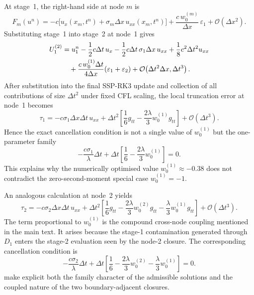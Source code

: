 \documentclass[review,hidelinks,onefignum,onetabnum]{siamart251216}
\newcommand{\Dt}{\Delta t}
\newcommand{\Dx}{\Delta x}
\newcommand{\Order}[1]{\mathcal{O}\!\left(#1\right)}
\begin{document}
At stage~1, the right-hand side at node $m$ is
\begin{equation}
  F_m(u^n)
  = -c\bigl[u_x(x_m,t^n)+\sigma_m\Dx\,u_{xx}(x_m,t^n)\bigr]
    + \frac{c\,w_0^{(m)}}{\Dx}\,\varepsilon_1
    + \Order{\Dx^2}.
  \label{eq:app-F1m}
\end{equation}
Substituting stage~1 into stage~2 at node~1 gives
\begin{align}
  U_1^{(2)}
  &= u_1^n
     - \frac{1}{2}c\Dt\,u_x
     - \frac{1}{2}c\Dt\,\sigma_1\Dx\,u_{xx}
     + \frac{1}{8}c^2\Dt^2 u_{xx}
     \notag\\
  &\quad
     + \frac{c\,w_0^{(1)}\Dt}{4\Dx}(\varepsilon_1+\varepsilon_2)
     + \Order{\Dt^2\Dx,\Dt^3}.
  \label{eq:app-U21}
\end{align}
After substitution into the final SSP-RK3 update and collection of all contributions of size $\Dt^2$ under fixed CFL scaling, the local truncation error at node~1 becomes
\begin{equation}
  \tau_1
  = -c\sigma_1\Dx\Dt\,u_{xx}
    + \Dt^2\left[
        \frac{1}{6}g_{tt}
        - \frac{2\lambda}{3}w_0^{(1)}g_{tt}
      \right]
    + \Order{\Dt^3}.
  \label{eq:app-tau1}
\end{equation}
Hence the exact cancellation condition is not a single value of $w_0^{(1)}$ but the one-parameter family
\begin{equation}
  -\frac{c\sigma_1}{\lambda}\Dt
  + \Dt\left[
      \frac{1}{6}
      - \frac{2\lambda}{3}w_0^{(1)}
    \right]=0.
  \label{eq:C1-full}
\end{equation}
This explains why the numerically optimised value $w_0^{(1)}\approx -0.38$ does not contradict the zero-second-moment special case $w_0^{(1)}=-1$.

An analogous calculation at node~2 yields
\begin{equation}
  \tau_2
  = -c\sigma_2\Dx\Dt\,u_{xx}
    + \Dt^2\left[
        \frac{1}{6}g_{tt}
        - \frac{2\lambda}{3}w_0^{(2)}g_{tt}
        - \frac{\lambda}{3}w_0^{(1)}g_{tt}
      \right]
    + \Order{\Dt^3}.
  \label{eq:app-tau2}
\end{equation}
The term proportional to $w_0^{(1)}$ is the compound cross-node coupling mentioned in the main text. It arises because the stage-1 contamination generated through $D_1$ enters the stage-2 evaluation seen by the node-2 closure. The corresponding cancellation condition is
\begin{equation}
  -\frac{c\sigma_2}{\lambda}\Dt
  + \Dt\left[
      \frac{1}{6}
      - \frac{2\lambda}{3}w_0^{(2)}
      - \frac{\lambda}{3}w_0^{(1)}
    \right]=0.
  \label{eq:C3-full}
\end{equation}
 make explicit both the family character of the admissible solutions and the coupled nature of the two boundary-adjacent closures.
\end{document}
